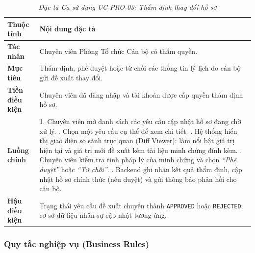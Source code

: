 \begin{table}[H]
\centering
\renewcommand{\arraystretch}{1.25}
\begin{tabularx}{\textwidth}{|p{3.2cm}|X|}
\hline
\textbf{Thuộc tính} & \textbf{Nội dung đặc tả} \\
\hline
\textbf{Tác nhân} & Chuyên viên Phòng Tổ chức Cán bộ có thẩm quyền. \\
\hline
\textbf{Mục tiêu} & Thẩm định, phê duyệt hoặc từ chối các thông tin lý lịch do cán bộ gửi đề xuất thay đổi. \\
\hline
\textbf{Tiền điều kiện} & Chuyên viên đã đăng nhập và tài khoản được cấp quyền thẩm định hồ sơ. \\
\hline
\textbf{Luồng chính} & 
1. Chuyên viên mở danh sách các yêu cầu cập nhật hồ sơ đang chờ xử lý. \newline
2. Chọn một yêu cầu cụ thể để xem chi tiết. \newline
3. Hệ thống hiển thị giao diện so sánh trực quan (Diff Viewer): làm nổi bật giá trị hiện tại và giá trị mới đề xuất kèm tài liệu minh chứng đính kèm. \newline
4. Chuyên viên kiểm tra tính pháp lý của minh chứng và chọn \textit{``Phê duyệt''} hoặc \textit{``Từ chối''}. \newline
5. Backend ghi nhận kết quả thẩm định, cập nhật hồ sơ chính thức (nếu duyệt) và gửi thông báo phản hồi cho cán bộ. \\
\hline
\textbf{Hậu điều kiện} & Trạng thái yêu cầu đề xuất chuyển thành \texttt{APPROVED} hoặc \texttt{REJECTED}; cơ sở dữ liệu nhân sự cập nhật tương ứng. \\
\hline
\end{tabularx}
\caption{\textit{Đặc tả Ca sử dụng UC-PRO-03: Thẩm định thay đổi hồ sơ}}
\label{tab:uc_pro_03}
\end{table}

\subsubsection{Quy tắc nghiệp vụ (Business Rules)}

